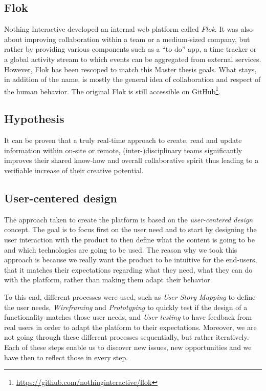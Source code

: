 \documentclass[a4paper,12pt, oneside]{article}
\begin{document}
\subsection{Flok}
Nothing Interactive developed an internal web platform called \emph{Flok}.
It was also about improving collaboration within a team or a medium-sized company, but rather by providing various components such as a “to do” app, a time tracker or a global activity stream to which events can be aggregated from external services.
However, Flok has been rescoped to match this Master thesis goals.
What stays, in addition of the name, is mostly the general idea of collaboration and respect of the human behavior.
The original Flok is still accessible on GitHub\footnote{\url{https://github.com/nothinginteractive/flok}}.

\subsection{Hypothesis}
\label{hypothesis}
It can be proven that a truly real-time approach to create, read and update information within on-site or remote, (inter-)disciplinary teams significantly improves their shared know-how and overall collaborative spirit thus leading to a verifiable increase of their creative potential.

\subsection{User-centered design}
The approach taken to create the platform is based on the \emph{user-centered design} concept.
The goal is to focus first on the user need and to start by designing the user interaction with the product to then define what the content is going to be and which technologies are going to be used.
The reason why we took this approach is because we really want the product to be intuitive for the end-users, that it matches their expectations regarding what they need, what they can do with the platform, rather than making them adapt their behavior.

To this end, different processes were used, such as \emph{User Story Mapping} to define the user needs, \emph{Wireframing} and \emph{Prototyping} to quickly test if the design of a functionality matches those user needs, and \emph{User testing} to have feedback from real users in order to adapt the platform to their expectations.
Moreover, we are not going through these different processes sequentially, but rather iteratively.
Each of these steps enable us to discover new issues, new opportunities and we have then to reflect those in every step.
\end{document}

